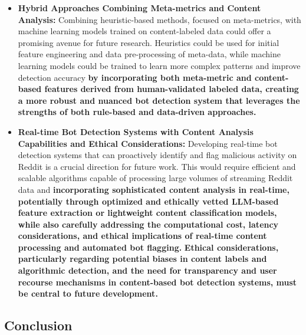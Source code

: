 \documentclass[
  12pt,
  letterpaper,
  DIV=11,
  numbers=noendperiod]{scrartcl}
\begin{document}
\begin{itemize}
{  understand deeper semantic, stylistic, and contextual cues that
  differentiate human and bot-generated text.}
\item
  \textbf{Hybrid Approaches Combining Meta-metrics and Content
  Analysis:} Combining heuristic-based methods, focused on meta-metrics,
  with machine learning models trained on content-labeled data could
  offer a promising avenue for future research. Heuristics could be used
  for initial feature engineering and data pre-processing of meta-data,
  while machine learning models could be trained to learn more complex
  patterns and improve detection accuracy \textbf{by incorporating both
  meta-metric and content-based features derived from human-validated
  labeled data, creating a more robust and nuanced bot detection system
  that leverages the strengths of both rule-based and data-driven
  approaches.}
\item
  \textbf{Real-time Bot Detection Systems with Content Analysis
  Capabilities and Ethical Considerations:} Developing real-time bot
  detection systems that can proactively identify and flag malicious
  activity on Reddit is a crucial direction for future work. This would
  require efficient and scalable algorithms capable of processing large
  volumes of streaming Reddit data and \textbf{incorporating
  sophisticated content analysis in real-time, potentially through
  optimized and ethically vetted LLM-based feature extraction or
  lightweight content classification models, while also carefully
  addressing the computational cost, latency considerations, and ethical
  implications of real-time content processing and automated bot
  flagging.} \textbf{Ethical considerations, particularly regarding
  potential biases in content labels and algorithmic detection, and the
  need for transparency and user recourse mechanisms in content-based
  bot detection systems, must be central to future development.}
\end{itemize}

\subsection{Conclusion}\label{conclusion}
\end{document}
